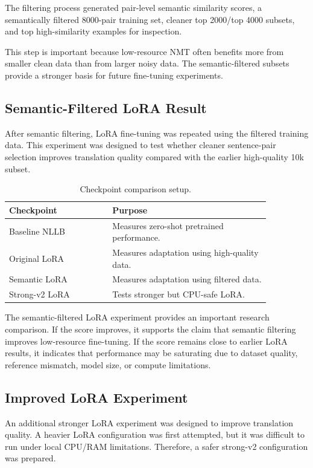 \documentclass[conference]{IEEEtran}
\begin{document}
The filtering process generated pair-level semantic similarity scores, a semantically filtered 8000-pair training set, cleaner top 2000/top 4000 subsets, and top high-similarity examples for inspection.

This step is important because low-resource NMT often benefits more from smaller clean data than from larger noisy data. The semantic-filtered subsets provide a stronger basis for future fine-tuning experiments.

\subsection{Semantic-Filtered LoRA Result}

After semantic filtering, LoRA fine-tuning was repeated using the filtered training data. This experiment was designed to test whether cleaner sentence-pair selection improves translation quality compared with the earlier high-quality 10k subset.

\begin{table}[H]
\centering
\caption{Checkpoint comparison setup.}
\footnotesize
\begin{tabular}{p{0.34\linewidth}p{0.52\linewidth}}
\toprule
\textbf{Checkpoint} & \textbf{Purpose} \\
\midrule
Baseline NLLB & Measures zero-shot pretrained performance. \\
Original LoRA & Measures adaptation using high-quality data. \\
Semantic LoRA & Measures adaptation using filtered data. \\
Strong-v2 LoRA & Tests stronger but CPU-safe LoRA. \\
\bottomrule
\end{tabular}
\end{table}

The semantic-filtered LoRA experiment provides an important research comparison. If the score improves, it supports the claim that semantic filtering improves low-resource fine-tuning. If the score remains close to earlier LoRA results, it indicates that performance may be saturating due to dataset quality, reference mismatch, model size, or compute limitations.

\subsection{Improved LoRA Experiment}

An additional stronger LoRA experiment was designed to improve translation quality. A heavier LoRA configuration was first attempted, but it was difficult to run under local CPU/RAM limitations. Therefore, a safer strong-v2 configuration was prepared.
\end{document}
